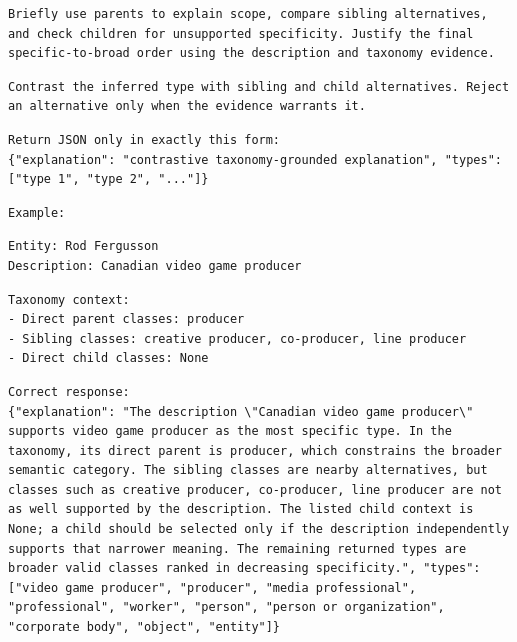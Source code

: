 \begin{Verbatim}[fontsize=\footnotesize,breaklines=true,breakanywhere=true]
Briefly use parents to explain scope, compare sibling alternatives, and check children for unsupported specificity. Justify the final specific-to-broad order using the description and taxonomy evidence.
\end{Verbatim}

\begin{Verbatim}[fontsize=\footnotesize,breaklines=true,breakanywhere=true]
Contrast the inferred type with sibling and child alternatives. Reject an alternative only when the evidence warrants it.
\end{Verbatim}

\begin{Verbatim}[fontsize=\footnotesize,breaklines=true,breakanywhere=true]
Return JSON only in exactly this form:
{"explanation": "contrastive taxonomy-grounded explanation", "types": ["type 1", "type 2", "..."]}
\end{Verbatim}

\begin{Verbatim}[fontsize=\footnotesize,breaklines=true,breakanywhere=true]
Example:
\end{Verbatim}

\begin{Verbatim}[fontsize=\footnotesize,breaklines=true,breakanywhere=true]
Entity: Rod Fergusson
Description: Canadian video game producer
\end{Verbatim}

\begin{Verbatim}[fontsize=\footnotesize,breaklines=true,breakanywhere=true]
Taxonomy context:
- Direct parent classes: producer
- Sibling classes: creative producer, co-producer, line producer
- Direct child classes: None
\end{Verbatim}

\begin{Verbatim}[fontsize=\footnotesize,breaklines=true,breakanywhere=true]
Correct response:
{"explanation": "The description \"Canadian video game producer\" supports video game producer as the most specific type. In the taxonomy, its direct parent is producer, which constrains the broader semantic category. The sibling classes are nearby alternatives, but classes such as creative producer, co-producer, line producer are not as well supported by the description. The listed child context is None; a child should be selected only if the description independently supports that narrower meaning. The remaining returned types are broader valid classes ranked in decreasing specificity.", "types": ["video game producer", "producer", "media professional", "professional", "worker", "person", "person or organization", "corporate body", "object", "entity"]}
\end{Verbatim}

